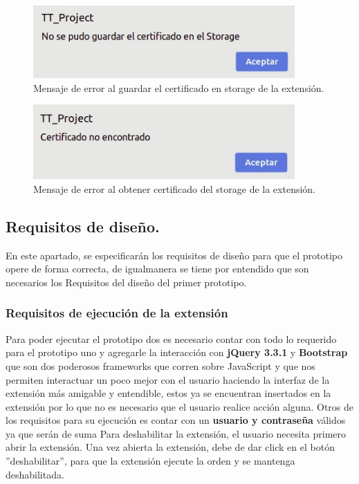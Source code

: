\documentclass[12pt, a4paper, titlepage]{report}
\begin{document}
    			\begin{figure}[H]
    				\begin{center}	\includegraphics[width=10cm]{./imagenes/Disenio/Componente_1/UI_certNotSavedInStorage.jpeg}
    					\caption[Mensaje de error]{Mensaje de error al guardar el certificado en storage de la extensión.}
    					\label{fig:UI_certNotSavedInStorage}
    				\end{center}
    			\end{figure}
    			
    			\begin{figure}[H]
    				\begin{center}	\includegraphics[width=10cm]{./imagenes/Disenio/Componente_1/UI_certNotFound.jpeg}
    					\caption[Mensaje de error en certificado]{Mensaje de error al obtener certificado del storage de la extensión.}
    					\label{fig:UI_certNotFound}
    				\end{center}
    			\end{figure}
			
    	    \subsection{Requisitos de diseño.}
    			   En este apartado, se especificarán los requisitos de diseño para que el prototipo opere de forma correcta, de igualmanera se tiene por entendido que son necesarios los Requisitos del diseño del primer prototipo.
    			   \subsubsection{Requisitos de ejecución de la extensi\'on}
    			        Para poder ejecutar el prototipo dos es necesario contar con todo lo requerido para el prototipo uno y agregarle la interacci\'on con \textbf{jQuery 3.3.1 } y \textbf{Bootstrap} que son dos poderosos frameworks que corren sobre JavaScript y que nos permiten interactuar un poco mejor con el usuario haciendo la interfaz de la extensi\'on más amigable y entendible, estos ya se encuentran insertados en la extensión por lo que no es necesario que el usuario realice acción alguna.
    			        Otros de los requisitos para su ejecución es contar con un \textbf{usuario y contraseña} válidos ya que ser\'an de suma    			    Para deshabilitar la extensión, el usuario necesita primero abrir la extensión. Una vez abierta la extensión, debe de dar click en el botón ''deshabilitar'', para que la extensión ejecute la orden y se mantenga deshabilitada.
\end{document}
